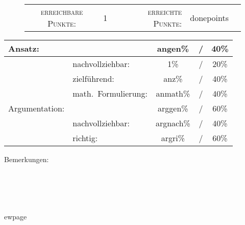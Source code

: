 \documentclass{article}
\begin{document}
\vspace{-0.5cm}
\begin{figure}[h!]
\begin{tabular}{crcrcr}
\textsc{erreichbare Punkte:} &1& & \textsc{erreichte Punkte:} &donepoints
\end{tabular}
\end{figure}
\vspace{-0.1cm}
\begin{minipage}[t]{0.6\textwidth}
\flushleft
\begin{tabular}{l|lccc}
Ansatz:& &angen\%&/&40\%\\\hline
&nachvollziehbar:&1\%&/&20\%\\
&zielf{\"u}hrend:&anz\%&/&40\%\\
&math.~Formulierung:& anmath\%&/&40\%\\\hline\hline
Argumentation:& &arggen\%&/&60\%\\\hline
&nachvollziehbar:&argnach\%&/&40\%\\
&richtig:&argri\%&/&60\%\\\hline
\end{tabular}
\end{minipage}
\hfill
\begin{minipage}[t]{0.4\textwidth}
	\vspace{-1.75cm}
	Bemerkungen:\\\vspace*{0.2cm}
	\underline{\hspace{0.75\textwidth}}\\\vspace*{0.2cm}
	\underline{\hspace{0.75\textwidth}}
	\\\vspace*{0.2cm}
	\underline{\hspace{0.75\textwidth}}
	\\\vspace*{0.2cm}
	\underline{\hspace{0.75\textwidth}}
	\\\vspace*{0.2cm}
	\underline{\hspace{0.75\textwidth}}
\end{minipage}
	\vspace{0.5cm}
ewpage
\end{document}
